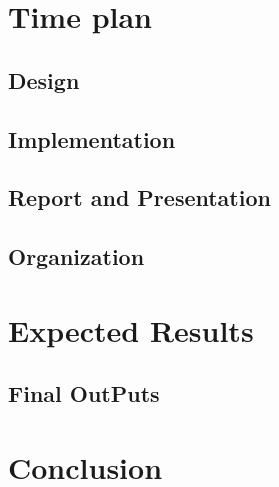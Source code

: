\documentclass[titlepage]{report}
\begin{document}

\chapter{Time plan}

\section{Design}
\lipsum[3]

\section{Implementation}
\lipsum[3]

\section{Report and Presentation}
\lipsum[3]

\section{Organization}
\lipsum[3]



\chapter{Expected Results}
\lipsum[3]

\section{Final OutPuts}

\lipsum[3]


\chapter{Conclusion}

\lipsum[2]

\end{document}
